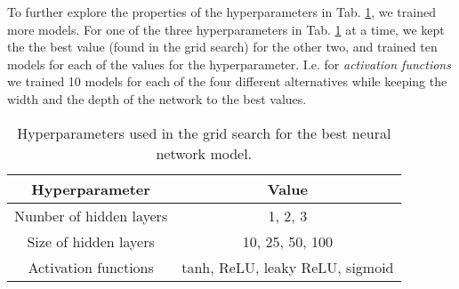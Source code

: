 To further explore the properties of the hyperparameters in Tab. \ref{tab:hyperparams}, we trained more models. 
For one of the three hyperparameters in Tab. \ref{tab:hyperparams} at a time, we kept the the best value (found in the grid search) for the other two, and trained ten models for each of the values for the hyperparameter. 
I.e. for \textit{activation functions} we trained 10 models for each of the four different alternatives while keeping the width and the depth of the network to the best values. 


\begin{table}[h!]
    \centering
    \begin{tabular}{|c|c|}
    \hline
        \textbf{Hyperparameter} & \textbf{Value}  \\ \hline
        Number of hidden layers & 1, 2, 3  \\ \hline
        Size of hidden layers & 10, 25, 50, 100 \\\hline
        Activation functions & tanh, ReLU, leaky ReLU, sigmoid \\ \hline
    \end{tabular}
    \caption{Hyperparameters used in the grid search for the best neural network model.}
    \label{tab:hyperparams}
\end{table}
